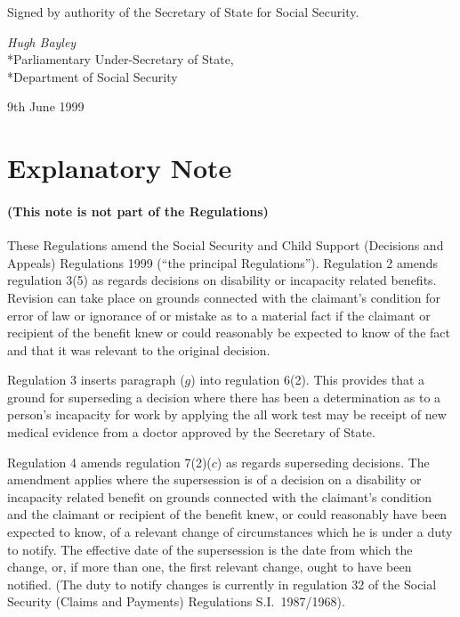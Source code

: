 \documentclass[12pt,a4paper]{article}
\begin{document}
\bigskip

Signed 
by authority of the Secretary of State for Social Security.

{\raggedleft
\emph{Hugh Bayley
}\\*Parliamentary Under-Secretary of State,\\*Department of Social Security

}

9th June 1999

\small

\part{Explanatory Note}

\renewcommand\parthead{--- Explanatory Note}

\subsection*{(This note is not part of the Regulations)}

These Regulations amend the Social Security and Child Support (Decisions and Appeals) Regulations 1999 (“the principal Regulations”). Regulation 2 amends regulation 3(5) as regards decisions on disability or incapacity related benefits. Revision can take place on grounds connected with the claimant’s condition for error of law or ignorance of or mistake as to a material fact if the claimant or recipient of the benefit knew or could reasonably be expected to know of the fact and that it was relevant to the original decision.

Regulation 3 inserts paragraph ($g$) into regulation 6(2). This provides that a ground for superseding a decision where there has been a determination as to a person’s incapacity for work by applying the all work test may be receipt of new medical evidence from a doctor approved by the Secretary of State.

Regulation 4 amends regulation 7(2)($c$) as regards superseding decisions. The amendment applies where the supersession is of a decision on a disability or incapacity related benefit on grounds connected with the claimant’s condition and the claimant or recipient of the benefit knew, or could reasonably have been expected to know, of a relevant change of circumstances which he is under a duty to notify. The effective date of the supersession is the date from which the change, or, if more than one, the first relevant change, ought to have been notified. (The duty to notify changes is currently in regulation 32 of the Social Security (Claims and Payments) Regulations S.I.\ 1987/1968).
\end{document}
